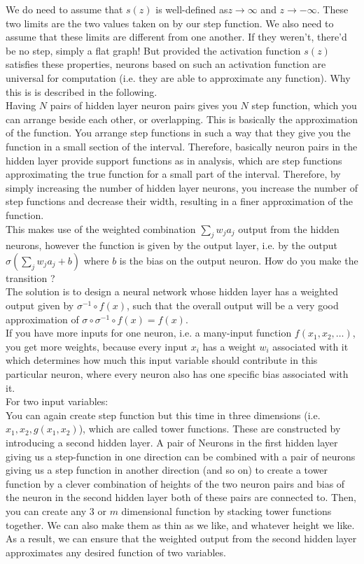 We do need to assume that $s(z)$ is well-defined as$z\rightarrow \infty$ and $z\rightarrow -\infty$. These two limits are the two values taken on by our step function. We also need to assume that these limits are different from one another. If they weren't, there'd be no step, simply a flat graph! But provided the activation function $s(z)$ satisfies these properties, neurons based on such an activation function are universal for computation (i.e. they are able to approximate any function). Why this is is described in the following.
\\
 Having $N$ pairs of hidden layer neuron pairs gives you $N$ step function, which you can arrange beside each other, or overlapping. This is basically the approximation of the function. You arrange step functions in such a way that they give you the function in a small section of the interval. Therefore, basically neuron pairs in the hidden layer provide support functions as in analysis, which are step functions approximating the true function for a small part of the interval. Therefore, by simply increasing the number of hidden layer neurons, you increase the number of step functions and decrease their width, resulting in a finer approximation of the function.\\
This makes use of the weighted combination $\sum_j w_j a_j$ output from the hidden neurons, however the function is given by the output layer, i.e. by the output $\sigma(\sum_j w_j a_j +b)$ where $b$ is the bias on the output neuron. How do you make the transition ?\\
The solution is to design a neural network whose hidden layer has a weighted output given by $\sigma^{-1}\circ f(x)$, such that the overall output will be a very good approximation of $\sigma\circ \sigma^{-1} \circ f(x) = f(x)$.
\\
If you have more inputs for one neuron, i.e. a many-input function $f(x_1,x_2,\dots)$, you get more weights, because every input $x_i$ has a weight $w_i$ associated with it which determines how much this input variable should contribute in this particular neuron, where every neuron also has one specific bias associated with it.\\
For two input variables:\\
 You can again create step function but this time in three dimensions (i.e. $x_1,x_2,g(x_1,x_2)$), which are called tower functions. These are constructed by introducing a second hidden layer. A pair of Neurons in the first hidden layer giving us a step-function in one direction can be combined with a pair of neurons giving us a step function in another direction (and so on) to create a tower function by a clever combination of heights of the two neuron pairs and bias of the neuron in the second hidden layer both of these pairs are connected to. Then, you can create any $3$ or $m$ dimensional function by stacking tower functions together. We can also make them as thin as we like, and whatever height we like. As a result, we can ensure that the weighted output from the second hidden layer approximates any desired function of two variables.
